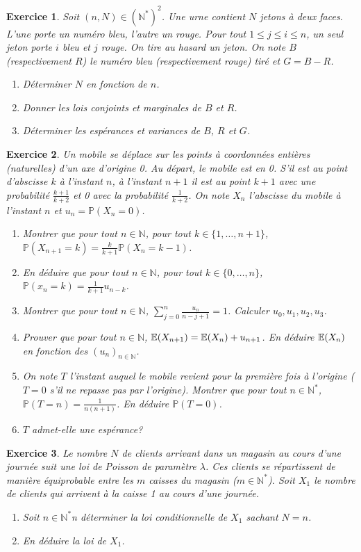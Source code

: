 \documentclass[12pt]{article}
\newtheorem{exercise}{Exercice}[section]
\theoremstyle{remark}
\theoremstyle{remark}
\newcommand{\N}{\mathbb{N}} \newcommand{\Z}{\mathbb{Z}}
\renewcommand{\P}{\mathbb{P}} \newcommand{\im}{\emph{Im}}
\begin{document}
\begin{exercise}
	Soit $(n,N)\in(\N^{*})^{2}$. Une urne contient $N$ jetons à deux faces. L'une
	porte un numéro bleu, l'autre un rouge. Pour tout $1\leqslant j\leqslant
	i\leqslant n$, un seul jeton porte $i$ bleu et $j$ rouge. On tire au hasard un
	jeton. On note $B$ (respectivement $R$) le numéro bleu (respectivement rouge)
	tiré et $G=B-R$.
	\begin{enumerate}
		\item
		Déterminer $N$ en fonction de $n$.
		\item
		Donner les lois conjoints et marginales de $B$ et $R$.
		\item
		Déterminer les espérances et variances de $B$, $R$ et $G$.
	\end{enumerate}
\end{exercise}

\begin{exercise}
	Un mobile se déplace sur les points à coordonnées entières (naturelles) d'un
	axe d'origine 0. Au départ, le mobile est en 0. S'il est au point d'abscisse
	$k$ à l'instant $n$, à l'instant $n+1$ il est au point $k+1$ avec une
	probabilité $\frac{k+1}{k+2}$ et 0 avec la probabilité $\frac{1}{k+2}$. On
	note $X_{n}$ l'abscisse du mobile à l'instant $n$ et $u_{n}=\P(X_{n}=0)$.
	\begin{enumerate}
		\item
		Montrer que pour tout $n\in\N$, pour tout $k\in\{1,\dots,n+1\}$,
		$\P(X_{n+1}=k)=\frac{k}{k+1}\P(X_{n}=k-1)$.
		\item
		En déduire que pour tout $n\in\N$, pour tout $k\in\{0,\dots,n\}$,
		$\P(x_{n}=k)=\frac{1}{k+1}u_{n-k}$.
		\item
		Montrer que pour tout $n\in\N$, $\sum_{j=0}^{n}\frac{u_{n}}{n-j+1}=1$.
		Calculer $u_{0},u_{1},u_{2},u_{3}$.
		\item
		Prouver que pour tout $n\in\N$, $\mathbb{E}(X_{n+1})=\mathbb{E}(X_{n})+u_{n+1}$. En
		déduire $\mathbb{E}(X_{n})$ en fonction des $(u_{n})_{n\in\N}$.
		\item
		On note $T$ l'instant auquel le mobile revient pour la première fois à
		l'origine ($T=0$ s'il ne repasse pas par l'origine). Montrer que pour tout
		$n\in\N^{*}$, $\P(T=n)=\frac{1}{n(n+1)}$. En déduire $\P(T=0)$.
		\item
		$T$ admet-elle une espérance?
	\end{enumerate}
\end{exercise}

\begin{exercise}
	Le nombre $N$ de clients arrivant dans un magasin au cours d'une journée suit
	une loi de Poisson de paramètre $\lambda$. Ces clients se répartissent de
	manière équiprobable entre les $m$ caisses du magasin ($m\in\N^{*}$). Soit
	$X_{1}$ le nombre de clients qui arrivent à la caisse 1 au cours d'une
	journée. 
	\begin{enumerate}
		\item
		Soit $n\in\N^{*}$n déterminer la loi conditionnelle de $X_{1}$ sachant
		$N=n$.
		\item
		En déduire la loi de $X_{1}$.
	\end{enumerate}
\end{exercise}
\end{document}
